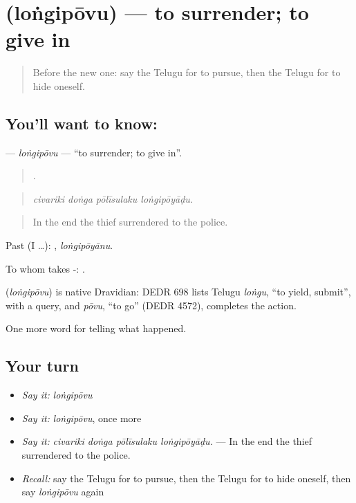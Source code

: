 \section[\texorpdfstring{\te{లొంగిపోవు} (loṅgipōvu)}{లొంగిపోవు (loṅgipōvu)}]{ (loṅgipōvu) — to surrender; to give in}

\label{lesson:TE-C352-longipovu}



\begin{quote}
Before the new one: say the Telugu for to pursue, then the Telugu for to hide oneself.
\end{quote}

\subsection*{You'll want to know: }
\textbf{} — \emph{loṅgipōvu} — \textquotedblleft{}to surrender; to give in\textquotedblright{}.

\begin{quote}
   .
\end{quote}

\begin{quote}
\emph{civariki doṅga pōlīsulaku loṅgipōyāḍu.}
\end{quote}

\begin{quote}
In the end the thief surrendered to the police.
\end{quote}

Past (I …): , \emph{loṅgipōyānu}.

To whom takes -:  .

\begin{cousinweb}
\textbf{} (\emph{loṅgipōvu}) is native Dravidian: DEDR 698 lists Telugu \emph{loṅgu}, \textquotedblleft{}to yield, submit\textquotedblright{}, with a query, and \emph{pōvu}, \textquotedblleft{}to go\textquotedblright{} (DEDR 4572), completes the action.
\end{cousinweb}

\begin{grammarlens}[title={What you've built}]
One more word for telling what happened.
\end{grammarlens}

\subsection*{Your turn}
\begin{itemize}
\raggedright
  \item \emph{Say it:} \emph{loṅgipōvu}
  \item \emph{Say it:} \emph{loṅgipōvu}, once more
  \item \emph{Say it:} \emph{civariki doṅga pōlīsulaku loṅgipōyāḍu.} — In the end the thief surrendered to the police.
  \item \emph{Recall:} say the Telugu for to pursue, then the Telugu for to hide oneself, then say \emph{loṅgipōvu} again
\end{itemize}

